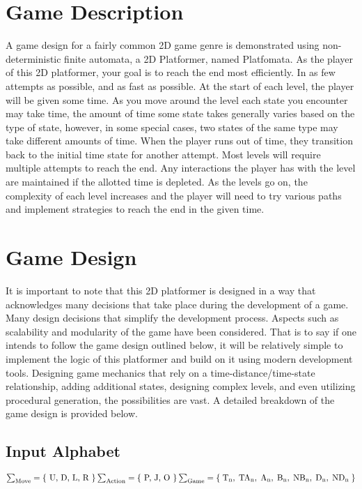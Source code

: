 \documentclass[10pt,twocolumn]{article}
\begin{document}
\section*{Game Description}
A game design for a fairly common 2D game genre is demonstrated using non-deterministic finite automata, a 2D Platformer, named Platfomata. As the player of this 2D platformer, your goal is to reach the end most efficiently. In as few attempts as possible, and as fast as possible. At the start of each level, the player will be given some time. As you move around the level each state you encounter may take time, the amount of time some state takes generally varies based on the type of state, however, in some special cases, two states of the same type may take different amounts of time. When the player runs out of time, they transition back to the initial time state for another attempt. Most levels will require multiple attempts to reach the end. Any interactions the player has with the level are maintained if the allotted time is depleted. As the levels go on, the complexity of each level increases and the player will need to try various paths and implement strategies to reach the end in the given time.

\section*{Game Design}
It is important to note that this 2D platformer is designed in a way that acknowledges many decisions that take place during the development of a game. Many design decisions that simplify the development process. Aspects such as scalability and modularity of the game have been considered. That is to say if one intends to follow the game design outlined below, it will be relatively simple to implement the logic of this platformer and build on it using modern development tools. Designing game mechanics that rely on a time-distance/time-state relationship, adding additional states, designing complex levels, and even utilizing procedural generation, the possibilities are vast. A detailed breakdown of the game design is provided below.

\subsection*{Input Alphabet}
\begin{math}
  \sum_{\text{Move}} = \{\text{ U, D, L, R }\} \\\\
  \sum_{\text{Action}} = \{\text{ P, J, O }\} \\\\
  \sum_{\text{Game}} = \{  \;
  \text{T}_{\text{n}},  \;
  \text{TA}_{\text{n}}, \;
  \text{A}_{\text{n}},  \;
  \text{B}_{\text{n}},  \;
  \text{NB}_{\text{n}}, \;
  \text{D}_{\text{n}},  \;
  \text{ND}_{\text{n}}  \;
  \}
\end{math}
\end{document}
